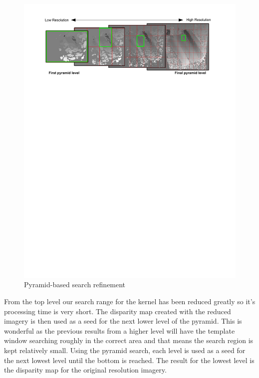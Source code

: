 \begin{figure}[h]
\begin{center}
  \includegraphics[trim = 0in 8.5in 0in 0in, width=7in]{images/stereo/pyramid_graphic.pdf}
\end{center}
  \caption{Pyramid-based search refinement}
  \label{fig:pyramid_search}
\end{figure}

From the top level our search range for the kernel has been reduced
greatly so it's processing time is very short. The disparity map
created with the reduced imagery is then used as a seed for the next
lower level of the pyramid. This is wonderful as the previous results
from a higher level will have the template window searching roughly in
the correct area and that means the search region is kept relatively
small. Using the pyramid search, each level is used as a seed for the
next lowest level until the bottom is reached. The result for the
lowest level is the disparity map for the original resolution imagery.

